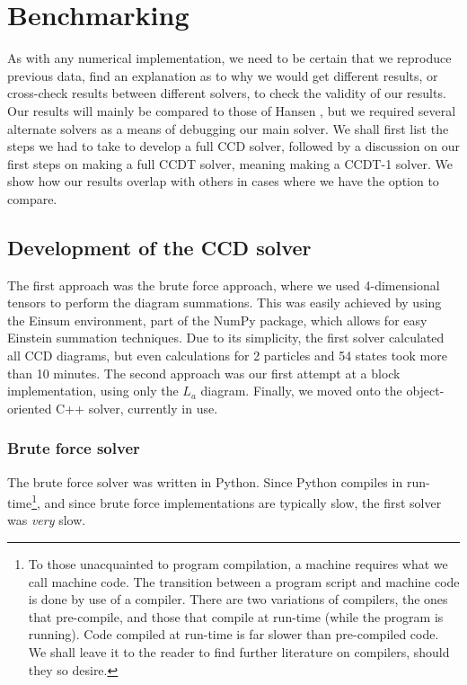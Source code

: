 \documentclass[10pt,twoside]{report}
\begin{document}
	\section{Benchmarking}
	\label{Implementation | sec | "benchmark"}
	As with any numerical implementation, we need to be certain that we reproduce previous data, find an explanation as to why we would get different results, or cross-check results between different solvers, to check the validity of our results. Our results will mainly be compared to those of Hansen \cite{Hansen15}, but we required several alternate solvers as a means of debugging our main solver. We shall first list the steps we had to take to develop a full CCD solver, followed by a discussion on our first steps on making a full CCDT solver, meaning making a CCDT-1 solver. We show how our results overlap with others in cases where we have the option to compare.
	
	\subsection{Development of the CCD solver}
	The first approach was the brute force approach, where we used 4-dimensional tensors to perform the diagram summations. This was easily achieved by using the Einsum environment, part of the NumPy package, which allows for easy Einstein summation techniques. Due to its simplicity, the first solver calculated all CCD diagrams, but even calculations for 2 particles and 54 states took more than 10 minutes. The second approach was our first attempt at a block implementation, using only the $L_a$ diagram. Finally, we moved onto the object-oriented C++ solver, currently in use.
	
	\subsubsection{Brute force solver}
	The brute force solver was written in Python. Since Python compiles in run-time\footnote{To those unacquainted to program compilation, a machine requires what we call machine code. The transition between a program script and machine code is done by use of a compiler. There are two variations of compilers, the ones that pre-compile, and those that compile at run-time (while the program is running). Code compiled at run-time is far slower than pre-compiled code. We shall leave it to the reader to find further literature on compilers, should they so desire.}, and since brute force implementations are typically slow, the first solver was \emph{very} slow.\\
	
\end{document}
